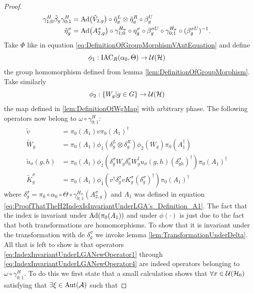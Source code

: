 \documentclass[12pt,a4paper,twoside]{article}
\numberwithin{equation}{section}
\begin{document}
\begin{proof}
	\begin{align}
		\label{eq:IndexInvariantUnderLGAEtaTildeDefiniton1}
		\gamma^{H}_{1;0}\tilde{\beta}_g\gamma^{H}_{0;1}&=\Ad{\tilde V_{2,g}}\circ\tilde{\eta}_g^L\otimes\tilde{\eta}_g^R\circ\beta_g^U\\
		\label{eq:IndexInvariantUnderLGAEtaTildeDefiniton2}
		\tilde{\eta}_g^\sigma&=\Ad{A_{2,g}^\sigma}\circ\gamma^{H_\sigma}_{1;0}\circ\eta_g^\sigma\circ\beta_g^{\sigma U}\circ\gamma^{H_\sigma}_{0;1}\circ(\beta_g^{\sigma U})^{-1}.
	\end{align}
	Take $\Phi$ like in equation \eqref{eq:DefinitionOfGroupMorphismVAutEquation} and define
	\begin{equation}
		\phi_1:\textrm{IAC}_R(\alpha_0,\Theta) \rightarrow \mathcal U(\mathcal H)
	\end{equation}
	the group homomorphism defined from lemma \ref{lem:DefinitionOfGroupMorphism}. Take similarly
	\begin{equation}
		\phi_2:\{W_g|g\in G\}\rightarrow \mathcal U(\mathcal H)
	\end{equation}
	the map defined in \ref{lem:DefinitionOfWgMap} with arbitrary phase. The following operators now belong to $\omega\circ\gamma^{H}_{0;1}:$
	\begin{align}
		\label{eq:IndexInvariantUnderLGANewOperator1}
		\tilde{v}&=\pi_0(A_1)v\pi_0(A_1)^\dagger\\
		\label{eq:IndexInvariantUnderLGANewOperator2}
		\tilde{W}_g&=\pi_0(A_1)\phi_1(\delta^L_g\otimes\delta^R_g)\phi_2( W_g)\pi_0(A_1^\dagger)\\
		\label{eq:IndexInvariantUnderLGANewOperator3}
		\tilde u_\sigma(g,h)&=\pi_0(A_1) \phi_1\left(\delta^\sigma_g W_g\delta^\sigma_h W_g^\dagger u_\sigma(g,h)(\delta^\sigma_{gh})^\dagger\right)\pi_0(A_1)^\dagger\\
		\label{eq:IndexInvariantUnderLGANewOperator4}
		\tilde{K}_g^\sigma&=\pi_0(A_1)\phi_1(v^\dagger \delta_g^\sigma v K_g^\sigma (\delta_g^\sigma)^\dagger) \pi_0(A_1)^\dagger
	\end{align}
	where $\delta^\sigma_g=\pi_0\circ\alpha_0\circ\Theta\circ\gamma^{H_\sigma}_{0;1}(A^\sigma_{2,g})$ and $A_1$ was defined in equation \eqref{eq:ProofThatTheH2IndexIsInvariantUnderLGA's_Definition_A1}. The fact that the index is invariant under $\Ad{\pi_0(A_1)}$ and under $\phi(\cdot)$ is just due to the fact that both transformations are homomorphisms. To show that it is invariant under the transformation with de $\delta^\sigma_g$ we invoke lemma \ref{lem:TransformationUnderDelta}. All that is left to show is that operators \eqref{eq:IndexInvariantUnderLGANewOperator1} through \eqref{eq:IndexInvariantUnderLGANewOperator4} are indeed operators belonging to $\omega\circ\gamma^{H}_{0;1}$. To do this we first state that a small calculation shows that $\forall x\in\mathcal U(\mathcal H_0)$ satisfying that $\exists\xi\in\Aut{\AA}$ such that

\end{proof}
\end{document}
